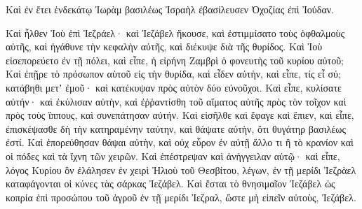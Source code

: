 {\par }{\PP {}Καὶ ἐν ἔτει ἑνδεκάτῳ Ἰωρὰμ βασιλέως Ἰσραὴλ ἐβασίλευσεν Ὀχοζίας ἐπὶ Ἰούδαν.
\par }{\PP {}Καὶ ἦλθεν Ἰοὺ ἐπὶ Ἰεζράελ· καὶ Ἰεζάβελ ἤκουσε, καὶ ἐστιμμίσατο τοὺς ὀφθαλμοὺς αὐτῆς, καὶ ἠγάθυνε τὴν κεφαλὴν αὐτῆς, καὶ διέκυψε διὰ τῆς θυρίδος.
Καὶ Ἰοὺ εἰσεπορεύετο ἐν τῇ πόλει, καὶ εἶπε, ἡ εἰρήνη Ζαμβρὶ ὁ φονευτὴς τοῦ κυρίου αὐτοῦ;
Καὶ ἐπῇρε τὸ πρόσωπον αὐτοῦ εἰς τὴν θυρίδα, καὶ εἶδεν αὐτὴν, καὶ εἶπε, τίς εἶ σύ; κατάβηθι μετʼ ἐμοῦ· καὶ κατέκυψαν πρὸς αὐτὸν δύο εὐνοῦχοι.
Καὶ εἶπε, κυλίσατε αὐτήν· καὶ ἐκύλισαν αὐτὴν, καὶ ἐῤῥαντίσθη τοῦ αἵματος αὐτῆς πρὸς τὸν τοῖχον καὶ πρὸς τοὺς ἵππους, καὶ συνεπάτησαν αὐτήν.
Καὶ εἰσῆλθε καὶ ἔφαγε καὶ ἔπιεν, καὶ εἶπε, ἐπισκέψασθε δὴ τὴν κατηραμένην ταύτην, καὶ θάψατε αὐτὴν, ὅτι θυγάτηρ βασιλέως ἐστί.
Καὶ ἐπορεύθησαν θάψαι αὐτὴν, καὶ οὐχ εὗρον ἐν αὐτῇ ἄλλο τι ἢ τὸ κρανίον καὶ οἱ πόδες καὶ τὰ ἴχνη τῶν χειρῶν.
Καὶ ἐπέστρεψαν καὶ ἀνήγγειλαν αὐτῷ· καὶ εἶπε, λόγος Κυρίου ὃν ἐλάλησεν ἐν χειρὶ Ἠλιοὺ τοῦ Θεσβίτου, λέγων, ἐν τῇ μερίδι Ἰεζρὰελ καταφάγονται οἱ κύνες τὰς σάρκας Ἰεζάβελ.
Καὶ ἔσται τὸ θνησιμαῖον Ἰεζάβελ ὡς κοπρία ἐπὶ προσώπου τοῦ ἀγροῦ ἐν τῇ μερίδι Ἰεζραλ, ὥστε μὴ εἰπεῖν αὐτοὺς, Ἰεζάβελ.

}
